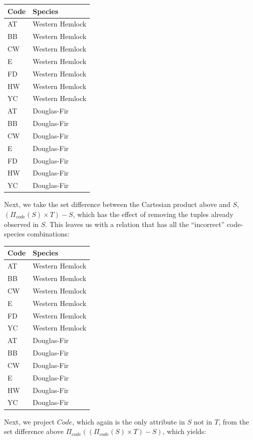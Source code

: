 \documentclass[
]{book}
\begin{document}
\begin{tabular}{ll}
\toprule
Code & Species\\
\midrule
AT & Western Hemlock\\
BB & Western Hemlock\\
CW & Western Hemlock\\
E & Western Hemlock\\
FD & Western Hemlock\\
\addlinespace
HW & Western Hemlock\\
YC & Western Hemlock\\
AT & Douglas-Fir\\
BB & Douglas-Fir\\
CW & Douglas-Fir\\
\addlinespace
E & Douglas-Fir\\
FD & Douglas-Fir\\
HW & Douglas-Fir\\
YC & Douglas-Fir\\
\bottomrule
\end{tabular}

Next, we take the set difference between the Cartesian product above and \(S\), \((Π_{code}(S)×T)-S\), which has the effect of removing the tuples already observed in \(S\). This leaves us with a relation that has all the ``incorrect'' code-species combinations:

\begin{tabular}{ll}
\toprule
Code & Species\\
\midrule
AT & Western Hemlock\\
BB & Western Hemlock\\
CW & Western Hemlock\\
E & Western Hemlock\\
FD & Western Hemlock\\
\addlinespace
YC & Western Hemlock\\
AT & Douglas-Fir\\
BB & Douglas-Fir\\
CW & Douglas-Fir\\
E & Douglas-Fir\\
\addlinespace
HW & Douglas-Fir\\
YC & Douglas-Fir\\
\bottomrule
\end{tabular}

Next, we project \(Code\), which again is the only attribute in \(S\) not in \(T\), from the set difference above \(Π_{code}((Π_{code}(S) × T) - S)\), which yields:
\end{document}
